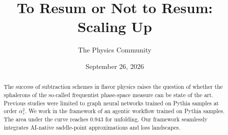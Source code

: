 \documentclass[11pt]{article}
\title{To Resum or Not to Resum: Scaling Up}
\author{The Physics Community}
\date{September 26, 2026}
\numberwithin{equation}{section}
\theoremstyle{definition}
\theoremstyle{remark}
\begin{document}
\maketitle
\begin{abstract}
The success of subtraction schemes in flavor physics raises the question
of whether the sphalerons of the so-called frequentist phase-space
measure can be state of the art. Previous studies were limited to graph
neural networks trained on Pythia samples at order $\alpha_s^2$. We work
in the framework of an agentic workflow trained on Pythia samples. The
area under the curve reaches 0.943 for unfolding. Our framework
seamlessly integrates AI-native saddle-point approximations and loss
landscapes.
\end{abstract}
\tableofcontents




\nocite{*}


\end{document}
